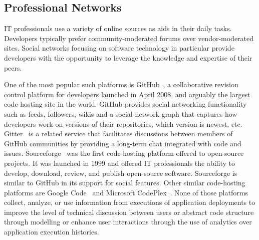 \subsection{Professional Networks}

 
IT professionals use a variety of online sources as aids in their daily tasks. Developers typically prefer community-moderated forums over vendor-moderated sites.%
 Social networks focusing on software technology in particular provide developers with the opportunity to leverage the knowledge and expertise of their peers.
 
One of the most popular such platforms is GitHub~\cite{github_url}, a collaborative revision control platform for developers launched in April 2008, and arguably the largest code-hosting site in the world. 
GitHub provides social networking functionality such as feeds, followers, wikis and a social network graph that captures how developers work on versions of their repositories, which version is newest, etc.
Gitter~\cite{gitter} is a related service that facilitates discussions between members of GitHub communities by providing a long-term chat integrated with code and issues.
Sourceforge~\cite{sourceforge} was the first code-hosting platform offered to open-source projects. It was launched in 1999 and offered IT professionals the ability to develop, download, review, and publish open-source software. Sourceforge is similar to GitHub in its support for social features.
Other similar code-hosting platforms are Google Code~\cite{googlecode} and Microsoft CodePlex~\cite{codeplex}.
None of those platforms collect, analyze, or use information from executions of application deployments to improve the level of technical discussion between users or abstract code structure through modelling or enhance user interactions through the use of analytics over application execution histories.

